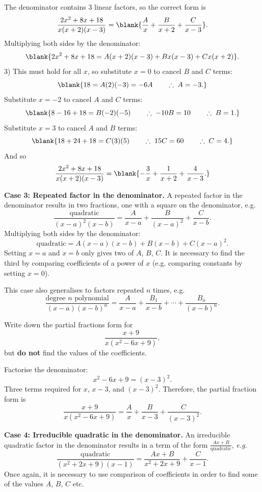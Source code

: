 \begin{solution}
The denominator contains 3 linear factors, so the correct form is
\[
\frac{2x^2+8x+18}{x(x+2)(x-3)}=\blank{\frac{A}{x}+\frac{B}{x+2}+\frac{C}{x-3}}.
\]
Multiplying both sides by the denominator:
\[
\blank{2x^2+8x+18=A(x+2)(x-3)+Bx(x-3)+Cx(x+2)}.
\]
3) This must hold for all $x$, so substitute $x=0$ to cancel $B$ and $C$ terms:
\[
\blank{18=A(2)(-3)=-6A \qquad \therefore \; A=-3.}
\]
Substitute $x=-2$ to cancel $A$ and $C$ terms:
\[
\blank{8-16+18=B(-2)(-5) \qquad \therefore \; -10B=10 \qquad \therefore \; B=1.}
\]
Substitute $x=3$ to cancel $A$ and $B$ terms:
\[
\blank{18+24+18=C(3)(5) \qquad \therefore \; 15C=60 \qquad \therefore \; C=4.}
\]
And so
\[
\frac{2x^2+8x+18}{x(x+2)(x-3)}=\blank{-\frac{3}{x}+\frac{1}{x+2}+\frac{4}{x-3}.}
\]
\end{solution}

\textbf{Case 3: Repeated factor in the denominator.} A repeated factor in the denominator results in two fractions, one with a square on the denominator, e.g.
\[
\frac{\text{quadratic}}{(x-a)^2(x-b)}=\frac{A}{x-a}+\frac{B}{(x-a)^2}+\frac{C}{x-b}.
\]
Multiplying both sides by the denominator:
\[
\text{quadratic}=A(x-a)(x-b)+B(x-b)+C(x-a)^2.
\]
Setting $x=a$ and $x=b$ only gives two of $A$, $B$, $C$. It is necessary to find the third by comparing coefficients of a power of $x$ (e.g. comparing constants by setting $x=0$).

This case also generalises to factors repeated $n$ times, e.g.
\[
\frac{\text{degree }n\text{ polynomial}}{(x-a)(x-b)^n}=\frac{A}{x-a}+\frac{B_1}{x-b}+\cdots+\frac{B_n}{(x-b)^n}.
\]

\begin{example}[DIY]
Write down the partial fractions form for
\[
\frac{x+9}{x(x^2-6x+9)},
\]
but \textbf{do not} find the values of the coefficients.
\end{example}

\begin{blanksol}
Factorise the denominator:
\[
x^2-6x+9=(x-3)^2.
\]
Three terms required for $x$, $x-3$, and $(x-3)^2$. Therefore, the partial fraction form is
\[
\frac{x+9}{x(x^2-6x+9)}=\frac{A}{x}+\frac{B}{x-3}+\frac{C}{(x-3)^2}.
\]
\end{blanksol}

\textbf{Case 4: Irreducible quadratic in the denominator.} An irreducible quadratic factor in the denominator results in a term of the form $\frac{Ax+B}{\text{quadratic}}$, \textit{e.g.}
\[
\frac{\text{quadratic}}{(x^2+2x+9)(x-1)}=\frac{Ax+B}{x^2+2x+9}+\frac{C}{x-1}.
\]
Once again, it is necessary to use comparison of coefficients in order to find some of the values $A$, $B$, $C$ etc.

